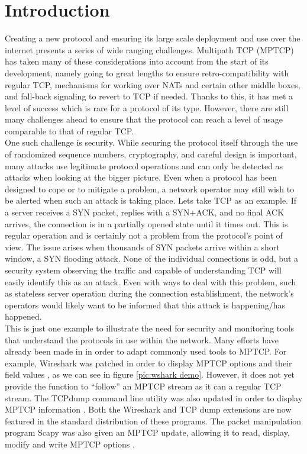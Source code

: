 \chapter{Introduction} \label{chap:intro}
Creating a new protocol and ensuring its large scale deployment and use over the internet presents a series of wide ranging challenges. Multipath TCP (MPTCP) has taken many of these considerations into account from the start of its development, namely going to great lengths to ensure retro-compatibility with regular TCP, mechanisms for working over NATs and certain other middle boxes, and fall-back signaling to revert to TCP if needed. Thanks to this, it has met a level of success which is rare for a protocol of its type. However, there are still many challenges ahead to ensure that the protocol can reach a level of usage comparable to that of regular TCP. \\

One such challenge is security. While securing the protocol itself through the use of randomized  sequence numbers, cryptography, and careful design is important, many attacks use legitimate protocol operations and can only be detected as attacks when looking at the bigger picture. Even when a protocol has been designed to cope or to mitigate a problem, a network operator may still wish to be alerted when such an attack is taking place. Lets take TCP as an example. If a server receives a SYN packet, replies with a SYN+ACK, and no final ACK arrives, the connection is in a partially opened state until it times out. This is regular operation and is certainly not a problem from the protocol's point of view. The issue arises when thousands of SYN packets arrive within a short window, a SYN flooding attack. None of the individual connections is odd, but a security system observing the traffic and capable of understanding TCP will easily identify this as an attack. Even with ways to deal with this problem, such as stateless server operation during the connection establishment, the network's operators would likely want to be informed that this attack is happening/has happened. \\

This is just one example to illustrate the need for security and monitoring tools that understand the protocols in use within the network. Many efforts have already been made in in order to adapt commonly used tools to MPTCP. For example, Wireshark \cite{wireshark} was patched in order to display MPTCP options and their field values \cite{mpwireshark}, as we can  see in figure \ref{pic:wshark demo}. However, it does not yet provide the function to ``follow'' an MPTCP stream as it can a regular TCP stream. The TCPdump \cite{tcpdump} command line utility was also updated in order to display MPTCP information \cite{mptcpdump}. Both the Wireshark and TCP dump extensions are now featured in the standard distribution of these programs. The packet manipulation program Scapy \cite{scapy} was also given an MPTCP update, allowing it to read, display, modify and write MPTCP options \cite{mpscapy} .   \\

